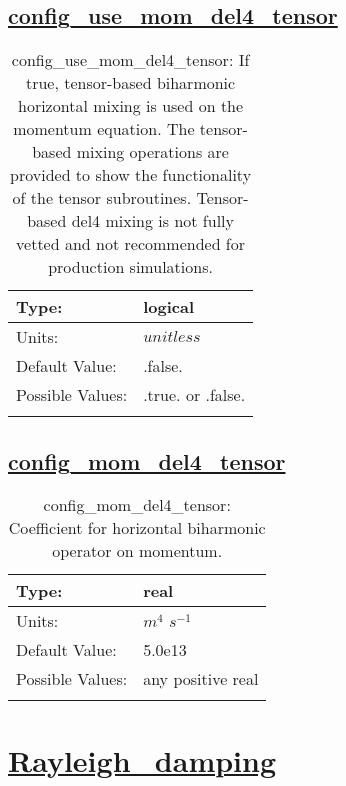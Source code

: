 \subsection[config\_use\_mom\_del4\_tensor]{\hyperref[sec:nm_tab_hmix_del4_tensor]{config\_use\_mom\_del4\_tensor}}
\label{subsec:nm_sec_config_use_mom_del4_tensor}
\begin{center}
\begin{longtable}{| p{2.0in} || p{4.0in} |}
    \hline
    Type: & logical \\
    \hline
    Units: & $unitless$ \\
    \hline
    Default Value: & .false. \\
    \hline
    Possible Values: & .true. or .false. \\
    \hline
    \caption{config\_use\_mom\_del4\_tensor: If true, tensor-based biharmonic horizontal mixing is used on the momentum equation. The tensor-based mixing operations are provided to show the functionality of the tensor subroutines. Tensor-based del4 mixing is not fully vetted and not recommended for production simulations.}
\end{longtable}
\end{center}
\subsection[config\_mom\_del4\_tensor]{\hyperref[sec:nm_tab_hmix_del4_tensor]{config\_mom\_del4\_tensor}}
\label{subsec:nm_sec_config_mom_del4_tensor}
\begin{center}
\begin{longtable}{| p{2.0in} || p{4.0in} |}
    \hline
    Type: & real \\
    \hline
    Units: & $m^4$ $s^{-1}$ \\
    \hline
    Default Value: & 5.0e13 \\
    \hline
    Possible Values: & any positive real \\
    \hline
    \caption{config\_mom\_del4\_tensor: Coefficient for horizontal biharmonic operator on momentum.}
\end{longtable}
\end{center}
\section[Rayleigh\_damping]{\hyperref[sec:nm_tab_Rayleigh_damping]{Rayleigh\_damping}}
\label{sec:nm_sec_Rayleigh_damping}
